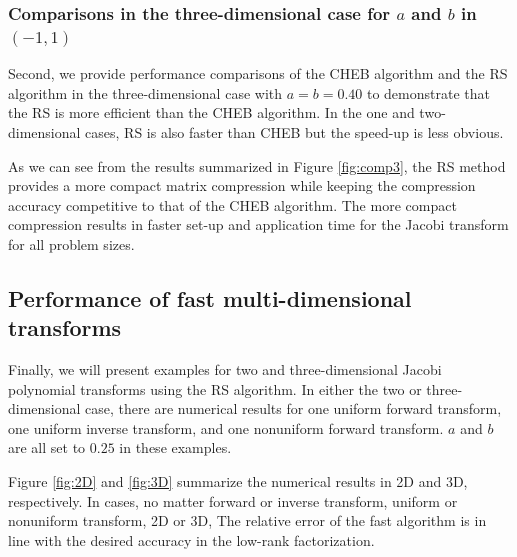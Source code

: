 \documentclass[11pt]{article}
\begin{document}
{{{}

\subsubsection{Comparisons in the three-dimensional case for $a$ and $b$ in $(-1,1)$}

Second, we provide performance comparisons of the CHEB algorithm and the RS algorithm in the three-dimensional case with $a=b=0.40$ to demonstrate that the RS is more efficient than the CHEB algorithm. In the one and two-dimensional cases, RS is also faster than CHEB but the speed-up is less obvious. 

As we can see from the results summarized in Figure \ref{fig:comp3}, the RS method provides a more compact matrix compression while keeping the compression accuracy competitive to that of the CHEB algorithm. The more compact compression results in faster set-up and application time for the Jacobi transform for all problem sizes.


\subsection{Performance of fast multi-dimensional transforms}
\label{sec:PFMT}
Finally, we will present examples for two and three-dimensional Jacobi polynomial transforms using the RS algorithm. In either the two or three-dimensional case, there are numerical results for one uniform forward transform, one uniform inverse transform, and one nonuniform forward transform. $a$ and $b$ are all set to $0.25$ in these examples. 


Figure \ref{fig:2D} and \ref{fig:3D} summarize the numerical results in 2D and 3D, respectively. In cases, no matter forward or inverse transform, uniform or nonuniform transform, 2D or 3D, {\color{blue}{the factorization of our algorithm scales like $O(n \log n)$ and the application time scales like $O(n^d \log n)$ or $O(n^d\log^2 n)$, where $d$ is the dimension. The numerical rank gradually increases like $O(\log n)$ as the problem size increases.}} The relative error of the fast algorithm is in line with the desired accuracy in the low-rank factorization. 
    
}}
\end{document}
